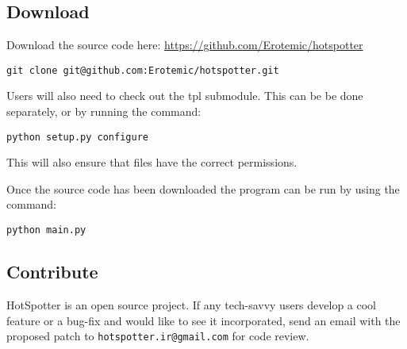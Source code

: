 \documentclass[a4paper,10pt]{article}
\makeatletter
\newcommand{\developeremail}{{\tt hotspotter.ir@gmail.com}}
\makeatother
\begin{document}
\subsection{Download}
Download the source code here: \url{https://github.com/Erotemic/hotspotter}
\begin{Verbatim}[commandchars=\\\{\}]
git clone git@github.com:Erotemic/hotspotter.git
\end{Verbatim}

Users will also need to check out the tpl submodule.  This can be be
done separately, or by running the command: 
\begin{Verbatim}[commandchars=\\\{\}]
python setup.py configure
\end{Verbatim}
This will also ensure that files have the correct permissions. 

Once the source code has been downloaded the program can be run by using the command:
\begin{Verbatim}[commandchars=\\\{\}]
python main.py
\end{Verbatim}



\subsection{Contribute}
HotSpotter is an open source project. If any tech-savvy users develop a cool
feature or a bug-fix and would like to see it incorporated, send an email with the proposed
patch to \developeremail{} for code review.

\newpage
\end{document}
